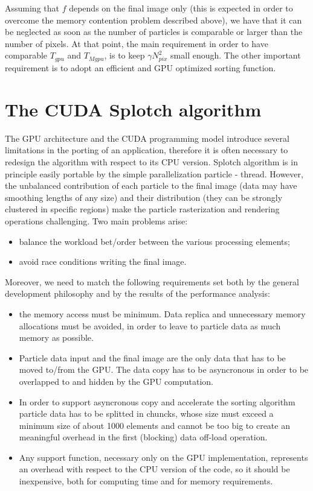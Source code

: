 \documentclass[11pt]{article}
\begin{document}
Assuming that $f$ depends on the final image only (this is expected in order 
to overcome the memory contention problem described above), we have that 
it can be neglected as soon as the number of particles is comparable or larger 
than the number of pixels. At that point, the main requirement in order 
to have comparable $T_{gpu}$ and $T_{Mgpu}$, is to keep $\gamma N_{pix}^2$
small enough. The other important requirement is to adopt an efficient 
and GPU optimized sorting function. 

\section{The CUDA Splotch algorithm}

The GPU architecture and the CUDA programming model introduce several limitations in the porting of an application, therefore it is often necessary to redesign the algorithm with respect to its CPU version. Splotch algorithm is in principle easily portable by the simple parallelization particle - thread. However, the unbalanced contribution of each particle to the final image (data may have smoothing lengths of any size) and their distribution (they can be strongly clustered in specific regions) make the particle rasterization and rendering operations challenging. 
Two main problems arise:
\begin{itemize}
\item 
balance the workload bet/order between the various processing elements;
\item
avoid race conditions writing the final image. 
\end{itemize}
Moreover, we need to match the following requirements set both by the general development philosophy and by the 
results of the performance analysis:
\begin{itemize}
\item
the memory access must be minimum. Data replica and unnecessary 
memory allocations must be avoided, in order to leave to particle
data as much memory as possible. 
\item
Particle data input and the final image are the only data that has to 
be moved to/from the GPU. The data copy has to be asyncronous in order
to be overlapped to and hidden by the GPU computation.
\item
In order to support asyncronous copy and accelerate the sorting algorithm
particle data has to be splitted in chuncks, whose size must exceed 
a minimum size of about 1000 elements and cannot be too big to create an
meaningful overhead in the first (blocking) data off-load operation.
\item
Any support function, necessary only on the GPU implementation, represents an overhead
with respect to the CPU version of the code, so it should be inexpensive,
both for computing time and for memory requirements. 
\end{itemize}
\end{document}
